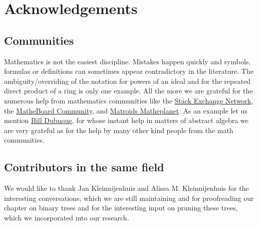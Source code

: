 \chapter*{Acknowledgements}
\label{ch:acknowledgements}
\vspace{0.8cm}

\section*{Communities}
\label{sec:communities}
Mathematics is not the easiest discipline. Mistakes happen quickly and symbols, formulas or definitions can sometimes appear contradictory in the literature. The ambiguity/overriding of the notation for powers of an ideal and for the repeated direct product of a ring is only one example. All the more we are grateful for the numerous help from mathematics communities like the \hyperlink{https://math.stackexchange.com}{Stack Exchange Network}, the \hyperlink{https://www.matheboard.de}{MatheBoard Community}, and \hyperlink{https://matheplanet.com}{Matroids Matheplanet}. As an example let us mention \hyperlink{https://math.stackexchange.com/users/242/bill-dubuque}{Bill Dubuque}, for whose instant help in matters of abstract algebra we are very grateful as for the help by many other kind people from the math communities.

\section*{Contributors in the same field}
\label{sec:contributors}
We would like to thank Jan Kleinnijenhuis and Alissa M. Kleinnijenhuis for the interesting conversations, which we are still maintaining and for proofreading our chapter on binary trees and for the interesting input on pruning these trees, which we incorporated into our research.